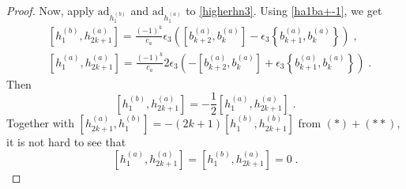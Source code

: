 \documentclass[11pt]{article}
\numberwithin{equation}{section}
\numberwithin{figure}{section}
\numberwithin{table}{section}
\begin{document}
\begin{proof}
Now, apply $\mathrm{ad}_{h^{(b)}_1}$ and $\mathrm{ad}_{h^{(a)}_1}$ to \eqref{higherhn3}. Using \eqref{ha1ba+-1}, we get
\begin{subequations}
	\begin{align}
		&\left[h^{(b)}_1,h^{(a)}_{2k+1}\right]=\frac{(-1)^k}{c_a}\epsilon_3\left(\left[b^{(a)}_{k+2},b^{(a)}_k\right]-\epsilon_3\left\{b^{(a)}_{k+1},b^{(a)}_k\right\}\right)\;,\\
		&\left[h^{(a)}_1,h^{(a)}_{2k+1}\right]=\frac{(-1)^k}{c_a}2\epsilon_3\left(-\left[b^{(a)}_{k+2},b^{(a)}_k\right]+\epsilon_3\left\{b^{(a)}_{k+1},b^{(a)}_k\right\}\right)\;.
	\end{align}
\end{subequations}
Then
\begin{equation}
	\left[h^{(b)}_1,h^{(a)}_{2k+1}\right]=-\frac{1}{2}\left[h^{(a)}_1,h^{(a)}_{2k+1}\right]\;.
\end{equation}
Together with $\left[h^{(a)}_{2k+1},h^{(b)}_1\right]=-(2k+1)\left[h^{(b)}_1,h^{(b)}_{2k+1}\right]$ from $(*)+(**)$, it is not hard to see that
\begin{equation}
	\left[h^{(a)}_1,h^{(a)}_{2k+1}\right]=\left[h^{(b)}_1,h^{(a)}_{2k+1}\right]=0\;.
\end{equation}


\end{proof}
\end{document}

